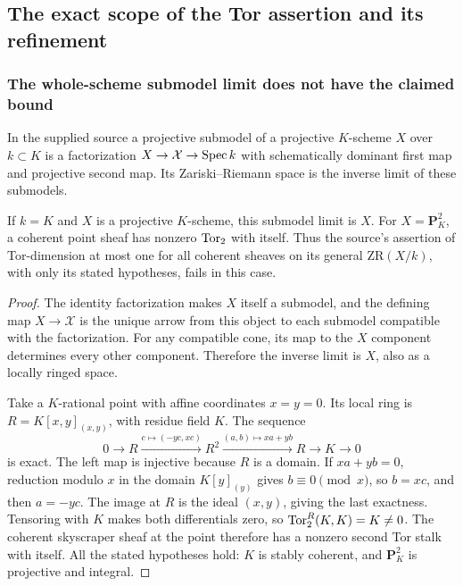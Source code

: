 \subsection{The exact scope of the Tor assertion and its refinement}
\label{sec:repair}

\subsubsection{The whole-scheme submodel limit does not have the claimed bound}

In the supplied source a projective submodel of a projective $K$-scheme
$X$ over $k\subset K$ is a factorization $X\to\mathcal X\to\operatorname{Spec} k$
with schematically dominant first map and projective second map.
Its Zariski--Riemann space is the inverse limit of these submodels.

\begin{proposition}
\label{prop:source-counterexample}
If $k=K$ and $X$ is a projective $K$-scheme, this submodel limit is $X$.
For $X=\mathbf P^2_K$, a coherent point sheaf has nonzero $\operatorname{Tor}_2$ with
itself. Thus the source's assertion of Tor-dimension at most one for
all coherent sheaves on its general $\mathrm{ZR}(X/k)$, with only its
stated hypotheses, fails in this case.
\end{proposition}
\begin{proof}
The identity factorization makes $X$ itself a submodel, and the defining
map $X\to\mathcal X$ is the unique arrow from this object to each
submodel compatible with the factorization. For any compatible cone,
its map to the $X$ component determines every other component.
Therefore the inverse limit is $X$, also as a locally ringed space.

Take a $K$-rational point with affine coordinates $x=y=0$. Its local ring
is $R=K[x,y]_{(x,y)}$, with residue field $K$. The sequence
\[
 0\longrightarrow R\xrightarrow{c\mapsto(-yc,xc)}R^2
 \xrightarrow{(a,b)\mapsto xa+yb}R\longrightarrow K\longrightarrow0
 \tag{AV7.1}\label{eq:koszul}
\]
is exact. The left map is injective because $R$ is a domain. If
$xa+yb=0$, reduction modulo $x$ in the domain $K[y]_{(y)}$ gives
$b\equiv0\pmod x$, so $b=xc$, and then $a=-yc$. The image at $R$ is
the ideal $(x,y)$, giving the last exactness. Tensoring with $K$ makes
both differentials zero, so $\operatorname{Tor}_2^R(K,K)=K\ne0$.
The coherent skyscraper sheaf at the point therefore has a nonzero
second Tor stalk with itself. All the stated hypotheses hold: $K$ is
stably coherent, and $\mathbf P^2_K$ is projective and integral.
\end{proof}

